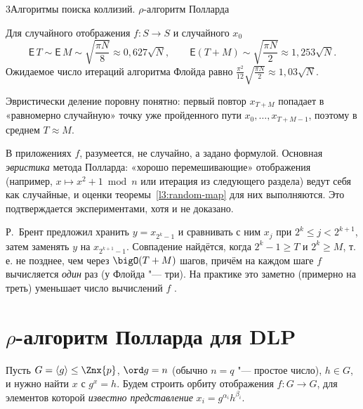 \begin{lecture}{3}{Алгоритмы поиска коллизий. \texorpdfstring{$\rho$}{ρ}-алгоритм Полларда}
\begin{theorem}\label{l3:random-map}
Для случайного отображения $f\colon S \to S$ и случайного $x_0$
\[
  \mathsf{E}\,T \sim \mathsf{E}\,M \sim \sqrt{\frac{\pi N}{8}} \approx 0{,}627\sqrt N, \qquad
  \mathsf{E}(T + M) \sim \sqrt{\frac{\pi N}{2}} \approx 1{,}253\sqrt N.
\]
Ожидаемое число итераций алгоритма Флойда равно $\frac{\pi^2}{12}\sqrt{\frac{\pi N}{2}}
\approx 1{,}03\sqrt N$.
\end{theorem}

Эвристически деление поровну понятно: первый повтор $x_{T+M}$ попадает в «равномерно
случайную» точку уже пройденного пути $x_0, \dots, x_{T+M-1}$, поэтому в среднем $T \approx M$.

В приложениях $f$, разумеется, не случайно, а задано формулой. Основная \emph{эвристика}
метода Полларда: «хорошо перемешивающие» отображения (например, $x \mapsto x^2 + 1 \bmod n$
или итерация из следующего раздела) ведут себя как случайные, и оценки
теоремы~\ref{l3:random-map} для них выполняются. Это подтверждается экспериментами, хотя
и не доказано.

\begin{remark}
Р.~Брент предложил хранить $y = x_{2^k - 1}$ и сравнивать с ним $x_j$ при
$2^k \le j < 2^{k+1}$, затем заменять $y$ на $x_{2^{k+1}-1}$. Совпадение найдётся,
когда $2^k - 1 \ge T$ и $2^k \ge M$, т.\,е. не позднее, чем через $\bigO(T + M)$ шагов,
причём на каждом шаге $f$ вычисляется \emph{один} раз (у Флойда "--- три). На практике
это заметно (примерно на треть) уменьшает число вычислений $f$ \cite[гл.~14]{galbraith}.
\end{remark}


\section{\texorpdfstring{$\rho$}{ρ}-алгоритм Полларда для DLP}

Пусть $G = \langle g \rangle \le \Znx{p}$, $\ord g = n$ (обычно $n = q$ "--- простое число),
$h \in G$, и нужно найти $x$ с $g^x = h$. Будем строить орбиту отображения $f\colon G \to G$,
для элементов которой \emph{известно представление} $x_i = g^{\alpha_i} h^{\beta_i}$.


\end{lecture}
